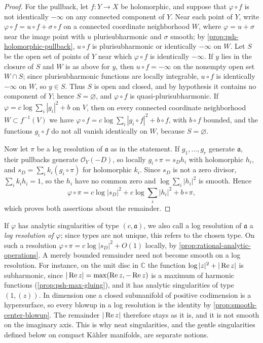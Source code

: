 \begin{proof}
For the pullback, let $f\colon Y\to X$ be holomorphic, and suppose that $\varphi\circ f$ is not identically $-\infty$ on any connected component of $Y$. Near each point of $Y$, write $\varphi\circ f=u\circ f+\sigma\circ f$ on a connected coordinate neighborhood $W$, where $\varphi=u+\sigma$ near the image point with $u$ plurisubharmonic and $\sigma$ smooth; by \cref{prop:psh-holomorphic-pullback}, $u\circ f$ is plurisubharmonic or identically $-\infty$ on $W$. Let $S$ be the open set of points of $Y$ near which $\varphi\circ f$ is identically $-\infty$. If $y$ lies in the closure of $S$ and $W$ is as above for $y$, then $u\circ f=-\infty$ on the nonempty open set $W\cap S$; since plurisubharmonic functions are locally integrable, $u\circ f$ is identically $-\infty$ on $W$, so $y\in S$. Thus $S$ is open and closed, and by hypothesis it contains no component of $Y$; hence $S=\varnothing$, and $\varphi\circ f$ is quasi-plurisubharmonic. If $\varphi=c\log\sum_i|g_i|^2+b$ on $V$, then on every connected coordinate neighborhood $W\subset f^{-1}(V)$ we have $\varphi\circ f=c\log\sum_i|g_i\circ f|^2+b\circ f$, with $b\circ f$ bounded, and the functions $g_i\circ f$ do not all vanish identically on $W$, because $S=\varnothing$.

Now let $\pi$ be a log resolution of $\mathfrak a$ as in the statement. If $g_1,\ldots,g_r$ generate $\mathfrak a$, their pullbacks generate $\mathcal O_Y(-D)$, so locally $g_i\circ\pi=s_Dh_i$ with holomorphic $h_i$, and $s_D=\sum_ik_i(g_i\circ\pi)$ for holomorphic $k_i$. Since $s_D$ is not a zero divisor, $\sum_ik_ih_i=1$, so the $h_i$ have no common zero and $\log\sum_i|h_i|^2$ is smooth. Hence
\[
 \varphi\circ\pi=c\log|s_D|^2+c\log\sum_i|h_i|^2+b\circ\pi,
\]
which proves both assertions about the remainder.
\end{proof}

If $\varphi$ has analytic singularities of type $(c,\mathfrak a)$, we also call a log resolution of $\mathfrak a$ a \emph{log resolution of $\varphi$}; since types are not unique, this refers to the chosen type. On such a resolution $\varphi\circ\pi=c\log|s_D|^2+O(1)$ locally, by \cref{prop:rational-analytic-operations}. A merely bounded remainder need not become smooth on a log resolution. For instance, on the unit disc in $\mathbb C$ the function $\log|z|^2+|\operatorname{Re} z|$ is subharmonic, since $|\operatorname{Re} z|=\max(\operatorname{Re} z,-\operatorname{Re} z)$ is a maximum of harmonic functions (\cref{prop:psh-max-gluing}), and it has analytic singularities of type $(1,(z))$. In dimension one a closed submanifold of positive codimension is a hypersurface, so every blowup in a log resolution is the identity by \cref{prop:smooth-center-blowup}. The remainder $|\operatorname{Re} z|$ therefore stays as it is, and it is not smooth on the imaginary axis. This is why neat singularities, and the gentle singularities defined below on compact K\"ahler manifolds, are separate notions.

